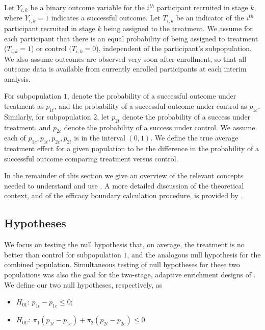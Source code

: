 \documentclass[article]{jss}
\begin{document}
Let $Y_{i,k}$ be a binary outcome variable for the $i^{th}$ participant recruited in stage $k$, where $Y_{i,k}=1$ indicates a successful outcome. Let $T_{i,k}$ be an indicator of   the $i^{th}$ participant recruited in stage $k$ being assigned to the treatment. We assume for each participant that there is an equal probability of being assigned to  treatment ($T_{i,k}=1$) or control $(T_{i,k}=0$), independent of the participant's subpopulation. We also assume outcomes are observed very soon after enrollment, so that all outcome data is available from currently enrolled participants at each interim analysis.

For subpopulation $1$, denote the probability of a successful outcome under treatment as $p_{1t}$, and the probability of a successful outcome under control as $p_{1c}$. Similarly, for subpopulation $2$, let $p_{2t}$ denote the probability of a success under treatment, and $p_{2c}$ denote the probability of a success under control. 
We assume each of $p_{1c},p_{1t},p_{2c},p_{2t}$ is in the interval $(0,1)$.
We define the true average treatment effect for a given population to be the difference in the probability of a successful outcome comparing treatment versus control.


In the remainder of this section we give an overview of the relevant concepts needed to understand and use . A more detailed discussion of the theoretical context, and of the efficacy boundary calculation procedure, is provided by \cite{Rosenblum2013AdaptMISTIE}.
 
\subsection{Hypotheses}
\label{sub:hypotheses}
We focus on testing the null hypothesis that, on average, the treatment is no better than control for subpopulation $1$, and the analogous null hypothesis for the combined population. Simultaneous testing of null hypotheses for these two populations was also the goal for the two-stage, adaptive enrichment designs of \cite{wangetal2007}.
We define our two null hypotheses, respectively, as

\begin{itemize}
\item $H_{01}$: $p_{1t}-p_{1c}≤0$;%
\item $H_{0C}$: $π_1(p_{1t}-p_{1c}) + π_2(p_{2t}-p_{2c}) ≤ 0$. %
\end{itemize}
\end{document}
